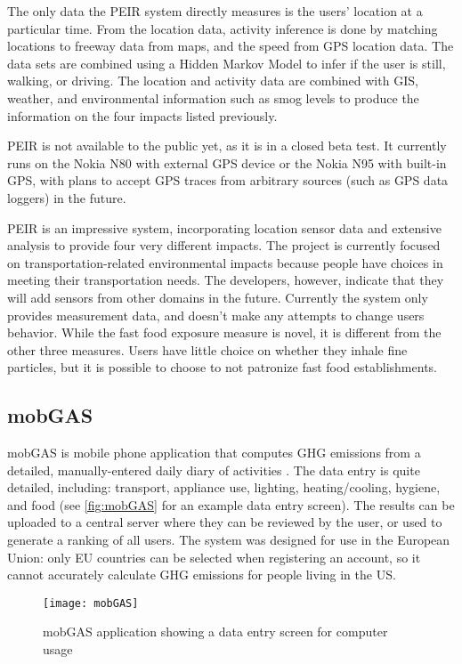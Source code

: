 The only data the PEIR system directly measures is the users' location at a particular time. From the location data, activity inference is done by matching locations to freeway data from maps, and the speed from GPS location data. The data sets are combined using a Hidden Markov Model to infer if the user is still, walking, or driving. The location and activity data are combined with GIS, weather, and environmental information such as smog levels to produce the information on the four impacts listed previously.

PEIR is not available to the public yet, as it is in a closed beta test. It currently runs on the Nokia N80 with external GPS device or the Nokia N95 with built-in GPS, with plans to accept GPS traces from arbitrary sources (such as GPS data loggers) in the future.

PEIR is an impressive system, incorporating location sensor data and extensive analysis to provide four very different impacts. The project is currently focused on transportation-related environmental impacts because people have  choices in meeting their transportation needs. The developers, however, indicate that they will add sensors from other domains in the future. Currently the system only provides measurement data, and doesn't make any attempts to change users behavior. While the fast food exposure measure is novel, it is different from the other three measures. Users have little choice on whether they inhale fine particles, but it is possible to choose to not patronize fast food establishments.

\subsection{mobGAS}
\label{sec:mobgas}

mobGAS is mobile phone application that computes GHG emissions from a detailed, manually-entered daily diary of activities \cite{mobGAS-website}. The data entry is quite detailed, including: transport, appliance use, lighting, heating/cooling, hygiene, and food (see \autoref{fig:mobGAS} for an example data entry screen). The results can be uploaded to a central server where they can be reviewed by the user, or used to generate a ranking of all users. The system was designed for use in the European Union: only EU countries can be selected when registering an account,  so it cannot accurately calculate GHG emissions for people living in the US.

\begin{figure}[htbp]
	\centering
		\texttt{[image: mobGAS]}
		\caption{mobGAS application showing a data entry screen for computer usage}
		\label{fig:mobGAS}
\end{figure}

